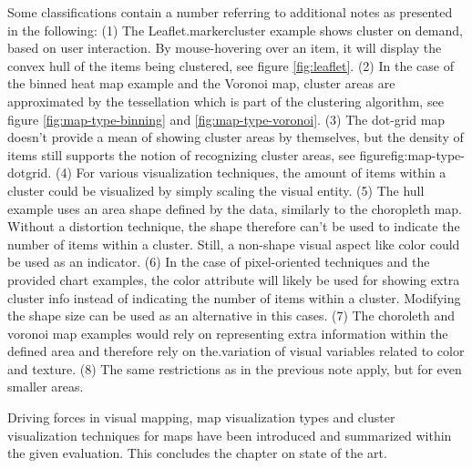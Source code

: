 Some classifications contain a number referring to additional notes as presented in the following: (1) The Leaflet.markercluster example shows cluster on demand, based on user interaction. By mouse-hovering over an item, it will display the convex hull of the items being clustered, see figure \ref{fig:leaflet}. (2) In the case of the binned heat map example and the Voronoi map, cluster areas are approximated by the tessellation which is part of the clustering algorithm, see figure \ref{fig:map-type-binning} and \ref{fig:map-type-voronoi}. (3) The dot-grid map doesn't provide a mean of showing cluster areas by themselves, but the density of items still supports the notion of recognizing cluster areas, see figure{fig:map-type-dotgrid}. (4) For various visualization techniques, the amount of items within a cluster could be visualized by simply scaling the visual entity. (5) The hull example uses an area shape defined by the data, similarly to the choropleth map. Without a distortion technique, the shape therefore can't be used to indicate the number of items within a cluster. Still, a non-shape visual aspect like color could be used as an indicator. (6) In the case of pixel-oriented techniques and the provided chart examples, the color attribute will likely be used for showing extra cluster info instead of indicating the number of items within a cluster. Modifying the shape size can be used as an alternative in this cases. (7) The choroleth and voronoi map examples would rely on representing extra information within the defined area and therefore rely on the.variation of visual variables related to color and texture. (8) The same restrictions as in the previous note apply, but for even smaller areas.

Driving forces in visual mapping, map visualization types and cluster visualization techniques for maps have been introduced and summarized within the given evaluation. This concludes the chapter on state of the art. 

